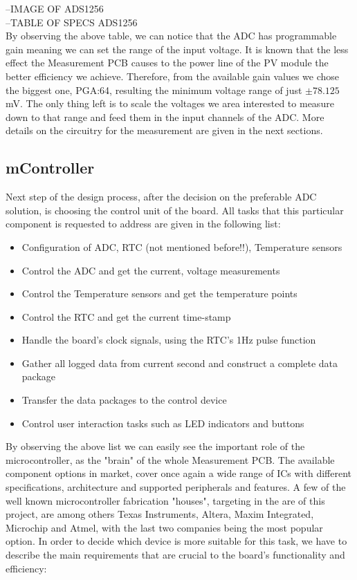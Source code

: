 --IMAGE OF ADS1256\\

--TABLE OF SPECS ADS1256\\

By observing the above table, we can notice that the ADC has programmable gain meaning we can set the range of the input voltage. It is known that the less effect the Measurement PCB causes to the power line of the PV module the better efficiency we achieve. Therefore, from the available gain values we chose the biggest one, PGA:64, resulting the minimum voltage range of just $\pm 78.125$mV. The only thing left is to scale the voltages we area interested to measure down to that range and feed them in the input channels of the ADC. More details on the circuitry for the measurement are given in the next sections.

\subsection{mController}
Next step of the design process, after the decision on the preferable ADC solution, is choosing the control unit of the board. All tasks that this particular component is requested to address are given in the following list:

\begin{itemize}
    \item Configuration of ADC, RTC (not mentioned before!!), Temperature sensors
    \item Control the ADC and get the current, voltage measurements
    \item Control the Temperature sensors and get the temperature points
    \item Control the RTC and get the current time-stamp
    \item Handle the board's clock signals, using the RTC's 1Hz pulse function
    \item Gather all logged data from current second and construct a complete data package
    \item Transfer the data packages to the control device
    \item Control user interaction tasks such as LED indicators and buttons
\end{itemize}

By observing the above list we can easily see the important role of the microcontroller, as the "brain" of the whole Measurement PCB. The available component options in market, cover once again a wide range of ICs with different specifications, architecture and supported peripherals and features. A few of the well known microcontroller fabrication "houses", targeting in the are of this project, are among others Texas Instruments, Altera, Maxim Integrated, Microchip and Atmel, with the last two companies being the most popular option. In order to decide which device is more suitable for this task, we have to describe the main requirements that are crucial to the board's functionality and efficiency:

